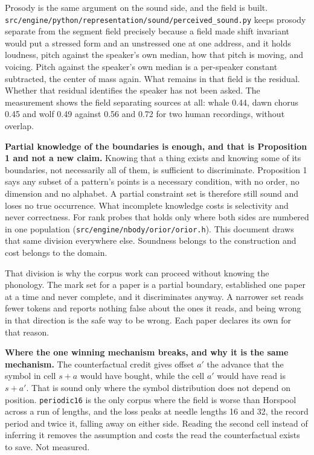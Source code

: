 Prosody is the same argument on the sound side, and the field is built. \texttt{src/\allowbreak{}engine/\allowbreak{}python/\allowbreak{}representation/\allowbreak{}sound/\allowbreak{}perceived\_\allowbreak{}sound.\allowbreak{}py} keeps prosody separate from the segment field precisely because a field made shift invariant would put a stressed form and an unstressed one at one address, and it holds loudness, pitch against the speaker's own median, how that pitch is moving, and voicing. Pitch against the speaker's own median is a per-speaker constant subtracted, the center of mass again. What remains in that field is the residual. Whether that residual identifies the speaker has not been asked. The measurement shows the field separating sources at all: whale 0.44, dawn chorus 0.45 and wolf 0.49 against 0.56 and 0.72 for two human recordings, without overlap.

\textbf{Partial knowledge of the boundaries is enough, and that is Proposition 1 and not a new claim.} Knowing that a thing exists and knowing some of its boundaries, not necessarily all of them, is sufficient to discriminate. Proposition 1 says any subset of a pattern's points is a necessary condition, with no order, no dimension and no alphabet. A partial constraint set is therefore still sound and loses no true occurrence. What incomplete knowledge costs is selectivity and never correctness. For rank probes that holds only where both sides are numbered in one population (\texttt{src/\allowbreak{}engine/\allowbreak{}nbody/\allowbreak{}orior/\allowbreak{}orior.h}). This document draws that same division everywhere else. Soundness belongs to the construction and cost belongs to the domain.

That division is why the corpus work can proceed without knowing the phonology. The mark set for a paper is a partial boundary, established one paper at a time and never complete, and it discriminates anyway. A narrower set reads fewer tokens and reports nothing false about the ones it reads, and being wrong in that direction is the safe way to be wrong. Each paper declares its own for that reason.

\textbf{Where the one winning mechanism breaks, and why it is the same mechanism.} The counterfactual credit gives offset \(a'\) the advance that the symbol in cell \(s+a\) would have bought, while the cell \(a'\) would have read is \(s+a'\). That is sound only where the symbol distribution does not depend on position. \texttt{periodic16} is the only corpus where the field is worse than Horspool across a run of lengths, and the loss peaks at needle lengths 16 and 32, the record period and twice it, falling away on either side. Reading the second cell instead of inferring it removes the assumption and costs the read the counterfactual exists to save. Not measured.

